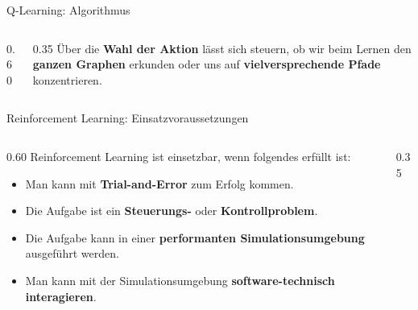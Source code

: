 \begin{frame}{Q-Learning: Algorithmus}
\begin{columns}
\begin{column}{0.60\textwidth}
\footnotesize
{}
\begin{algorithm}[H]
\DontPrintSemicolon
{}
\caption{Q-Learning -- Lernalgorithmus}
\end{algorithm}
\end{column}
\begin{column}{0.35\textwidth}
Über die \textbf{Wahl der Aktion} lässt sich steuern, ob wir beim Lernen den \textbf{ganzen Graphen} erkunden oder uns auf \textbf{vielversprechende Pfade} konzentrieren.
\end{column}
\end{columns}
\end{frame}


\begin{frame}{Reinforcement Learning: Einsatzvoraussetzungen}
\begin{columns}
\begin{column}{0.60\textwidth}
Reinforcement Learning ist einsetzbar, wenn folgendes erfüllt ist:
\begin{itemize}
\item Man kann mit \textbf{Trial-and-Error} zum Erfolg kommen.
\item Die Aufgabe ist ein \textbf{Steuerungs-} oder \textbf{Kontrollproblem}.
\item Die Aufgabe kann in einer \textbf{performanten Simulationsumgebung} ausgeführt werden.
\item Man kann mit der Simulationsumgebung \textbf{software-technisch interagieren}.
\end{itemize}
\end{column}
\begin{column}{0.35\textwidth}
\centering
{}
\end{column}
\end{columns}
\end{frame}

